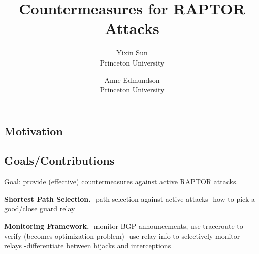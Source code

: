 \documentclass[letterpaper,twocolumn,10pt]{article}
\begin{document}
\date{}

\title{\Large \bf Countermeasures for RAPTOR Attacks}
\author{
 {\rm Yixin Sun}\\
 Princeton University
 \and
 {\rm Anne Edmundson}\\
 Princeton University
} %

\maketitle


\subsection*{Motivation}
\cite{sun2015raptor}

\subsection*{Goals/Contributions}
Goal: provide (effective) countermeasures against active RAPTOR attacks.

{\bf Shortest Path Selection.}
-path selection against active attacks
-how to pick a good/close guard relay

{\bf Monitoring Framework.}
-monitor BGP announcements, use traceroute to verify (becomes optimization problem)
-use relay info to selectively monitor relays
-differentiate between hijacks and interceptions
{\footnotesize 
}

\end{document}
